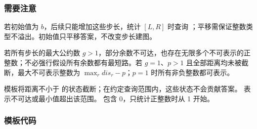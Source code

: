 \subsubsection*{需要注意}
若初始值为 $b$，后续只能增加这些步长，统计 $[L,R]$ 时查询 ；平移需保证整数类型不溢出。初始值只平移答案，不改变步长建图。

若所有步长的最大公约数 $g>1$，部分余数不可达，也存在无限多个不可表示的正整数；不必强行假设所有余数都有最短路。若 $g=1$、$p>1$ 且全部距离均未被截断，最大不可表示整数为 $\max_r dis_r-p$；$p=1$ 时所有非负整数都可表示。

模板将距离不小于  的状态截断；在约定查询范围内，这些状态不会贡献答案。 表示不可达或最小值超出该范围。 包含 0，只统计正整数时从 1 开始。

\subsubsection*{模板代码}
